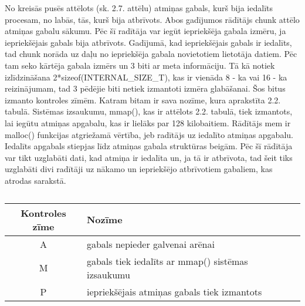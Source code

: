 No kreisās pusēs attēlots (sk. 2.7. attēlu) \cite{CHOFM} atmiņas gabals, kurš bija iedalīts procesam, no labās, tās, kurš bija atbrīvots.
Abos gadījumos rādītājs chunk attēlo atmiņas gabalu sākumu. Pēc šī radītāja var iegūt iepriekšēja gabala izmēru, ja iepriekšējais gabals bija atbrīvots.
Gadījumā, kad iepriekšējais gabals ir iedalīts, tad chunk norāda uz daļu no iepriekšēja gabala novietotiem lietotāja datiem. 
Pēc tam seko kārtēja gabala izmērs un 3 biti ar meta informāciju. 
Tā kā notiek izlīdzināšana 2*sizeof(INTERNAL\_SIZE\_T), kas ir vienāda 8 - ka vai 16 - ka  reizinājumam, tad 3 pēdējie biti netiek izmantoti izmēra glabāšanai. 
Šos bitus izmanto kontroles zīmēm. Katram bitam ir sava nozīme, kura aprakstīta 2.2. tabulā.
Sistēmas izsaukumu, mmap(), kas ir attēlots 2.2. tabulā, tiek izmantots, lai iegūtu atmiņas apgabalu, kas ir lielāks par 128 kilobaitiem. 
Rādītājs mem ir malloc() funkcijas atgriežamā vērtība, jeb radītājs uz iedalīto atmiņas apgabalu. Iedalīts apgabals stiepjas līdz atmiņas gabala struktūras beigām.
Pēc šī rādītāja var tikt uzglabāti dati, kad atmiņa ir iedalīta un, ja tā ir atbrīvota, tad šeit tiks uzglabāti divi radītāji uz nākamo un iepriekšējo atbrīvotiem gabaliem, kas atrodas sarakstā. 


  \begin{table}[H]
\caption{\textbf{\fontsize{11}{12}\selectfont {\\ Chunk gabala kontroles zīmes}}} 
\label{table:kysymys}
\centering
	\begin{tabular}{|c|l|r|p{5cm}|}
	  \hline
	Kontroles zīme & Nozīme \\
	\hline
	  A & gabals nepieder galvenai arēnai \\
      \hline
      M & gabals tiek iedalīts ar mmap() sistēmas izsaukumu \\
      \hline
      P & iepriekšējais atmiņas gabals tiek izmantots  \\
    \hline
	\end{tabular}
\end{table}

